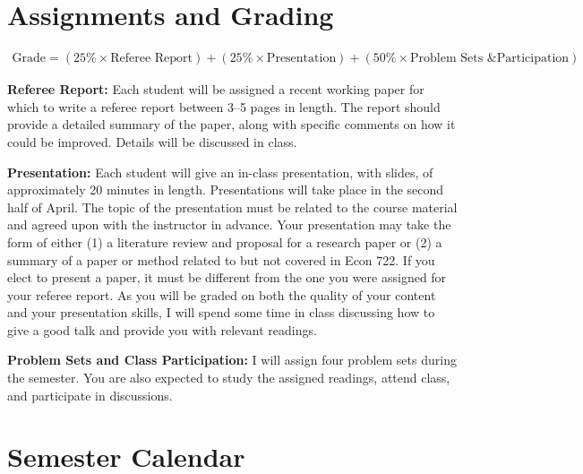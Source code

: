 \documentclass[11pt, letterpaper]{article}
\begin{document}
\medskip

\section*{Assignments and Grading}
	\begin{equation*}
	\begin{split}
    \mbox{Grade} = (25\% \times \mbox{Referee Report}) + (25\% \times \mbox{Presentation})  + (50\% \times \mbox{Problem Sets \& Participation}) 
	\end{split}
	\end{equation*}


\medskip

\noindent \textbf{Referee Report:} 
Each student will be assigned a recent working paper for which to write a referee report between 3--5 pages in length.
The report should provide a detailed summary of the paper, along with specific comments on how it could be improved.
Details will be discussed in class.

\medskip 
\noindent \textbf{Presentation:} 
Each student will give an in-class presentation, with slides, of approximately 20 minutes in length.
Presentations will take place in the second half of April.
The topic of the presentation must be related to the course material and agreed upon with the instructor in advance. 
Your presentation may take the form of either (1) a literature review and proposal for a research paper or (2) a summary of a paper or method related to but not covered in Econ 722.
If you elect to present a paper, it must be different from the one you were assigned for your referee report. 
As you will be graded on both the quality of your content and your presentation skills, I will spend some time in class discussing how to give a good talk and provide you with relevant readings. 

\medskip 
\noindent \textbf{Problem Sets and Class Participation:} 
I will assign four problem sets during the semester.
You are also expected to study the assigned readings, attend class, and participate in discussions.






\section*{Semester Calendar}
\end{document}
